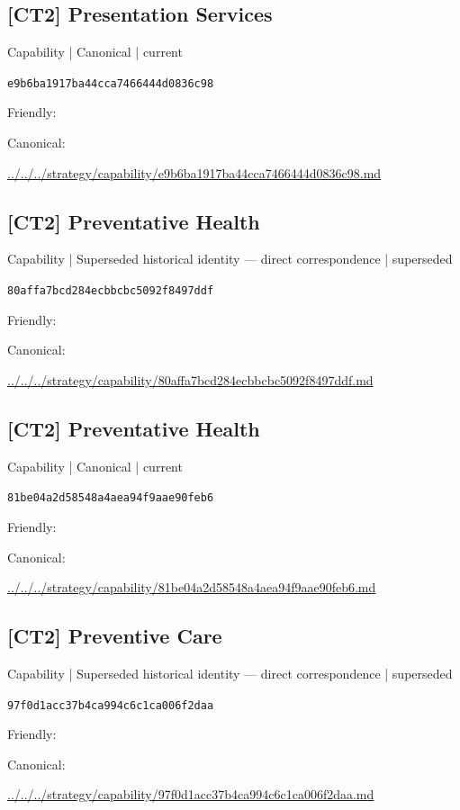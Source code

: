 \documentclass[10pt,a4paper]{article}
\begin{document}
\subsection*{[CT2] Presentation Services}
{\small Capability | Canonical | current}\par
\texttt{e9b6ba1917ba44cca7466444d0836c98}\par
Friendly: \par
Canonical: \par
{\footnotesize\url{../../../strategy/capability/e9b6ba1917ba44cca7466444d0836c98.md}}\par
\subsection*{[CT2] Preventative Health}
{\small Capability | Superseded historical identity — direct correspondence | superseded}\par
\texttt{80affa7bcd284ecbbcbc5092f8497ddf}\par
Friendly: \par
Canonical: \par
{\footnotesize\url{../../../strategy/capability/80affa7bcd284ecbbcbc5092f8497ddf.md}}\par
\subsection*{[CT2] Preventative Health}
{\small Capability | Canonical | current}\par
\texttt{81be04a2d58548a4aea94f9aae90feb6}\par
Friendly: \par
Canonical: \par
{\footnotesize\url{../../../strategy/capability/81be04a2d58548a4aea94f9aae90feb6.md}}\par
\subsection*{[CT2] Preventive Care}
{\small Capability | Superseded historical identity — direct correspondence | superseded}\par
\texttt{97f0d1acc37b4ca994c6c1ca006f2daa}\par
Friendly: \par
Canonical: \par
{\footnotesize\url{../../../strategy/capability/97f0d1acc37b4ca994c6c1ca006f2daa.md}}\par
\end{document}
